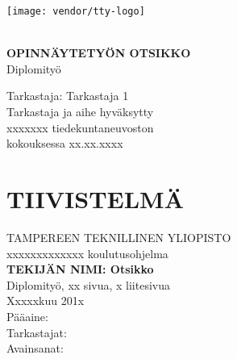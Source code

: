 \documentclass[12pt,a4paper,finnish]{vendor/tutthesis}
\begin{document}
\thispagestyle{empty}

\vspace*{-.5cm}\noindent


\texttt{[image: vendor/tty-logo]}

\vspace{6.8cm}

\\
{\bf\large \textsf{OPINNÄYTETYÖN OTSIKKO}}\\
\textsf{Diplomityö}

\vspace{8.7cm} %

\begin{flushright}

\begin{minipage}[c]{6.8cm}
\begin{spacing}{1.0}
\textsf{Tarkastaja: Tarkastaja 1}\\
\textsf{Tarkastaja ja aihe hyväksytty}\\
\textsf{xxxxxxx tiedekuntaneuvoston}\\
\textsf{kokouksessa xx.xx.xxxx}\\
\end{spacing}
\end{minipage}
\end{flushright}

\newpage

\setcounter{page}{1} %

\chapter*{TIIVISTELMÄ}
\begin{spacing}{1.0}
\textsf{TAMPEREEN TEKNILLINEN YLIOPISTO}\\
\textsf{xxxxxxxxxxxxx koulutusohjelma}\\
{\bf \textsf{TEKIJÄN NIMI: Otsikko}}\\
\textsf{Diplomityö, xx sivua, x liitesivua}\\
\textsf{Xxxxxkuu 201x}\\
\textsf{Pääaine: }\\
\textsf{Tarkastajat: }\\
\textsf{Avainsanat: }\\
\end{spacing}
\end{document}
